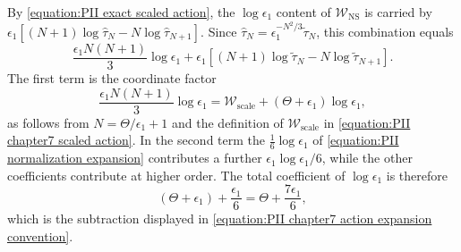 \documentclass[a4paper,11pt]{article}
\numberwithin{equation}{section}
\begin{document}
By \eqref{equation:PII exact scaled action}, the
$\log{\epsilon_{1}}$ content of $\mathcal{W}_{\mathrm{NS}}$ is
carried by
$\epsilon_{1}\left[(N+1)\log{\widehat{\tau}_{N}}
-N\log{\widehat{\tau}_{N+1}}\right]$.  Since
$\widehat{\tau}_{N}=\epsilon_{1}^{-N^{2}/3}\widetilde{\tau}_{N}$,
this combination equals
\begin{equation}
\frac{\epsilon_{1}N(N+1)}{3}\log{\epsilon_{1}}
+\epsilon_{1}\left[
(N+1)\log{\widetilde{\tau}_{N}}
-N\log{\widetilde{\tau}_{N+1}}\right].
\end{equation}
The first term is the coordinate factor
\begin{equation}
\label{equation:PII normalization coordinate factor}
\frac{\epsilon_{1}N(N+1)}{3}\log{\epsilon_{1}}
=\mathcal{W}_{\mathrm{scale}}
+\left(\Theta+\epsilon_{1}\right)\log{\epsilon_{1}},
\end{equation}
as follows from $N=\Theta/\epsilon_{1}+1$ and the definition of
$\mathcal{W}_{\mathrm{scale}}$ in
\eqref{equation:PII chapter7 scaled action}.  In the second term
the $\frac{1}{6}\log{\epsilon_{1}}$ of
\eqref{equation:PII normalization expansion} contributes a further
$\epsilon_{1}\log{\epsilon_{1}}/6$, while the other coefficients
contribute at higher order.  The total coefficient of
$\log{\epsilon_{1}}$ is therefore
\begin{equation}
\label{equation:PII normalization subtraction}
\left(\Theta+\epsilon_{1}\right)+\frac{\epsilon_{1}}{6}
=\Theta+\frac{7\epsilon_{1}}{6},
\end{equation}
which is the subtraction displayed in
\eqref{equation:PII chapter7 action expansion convention}.


\end{document}
